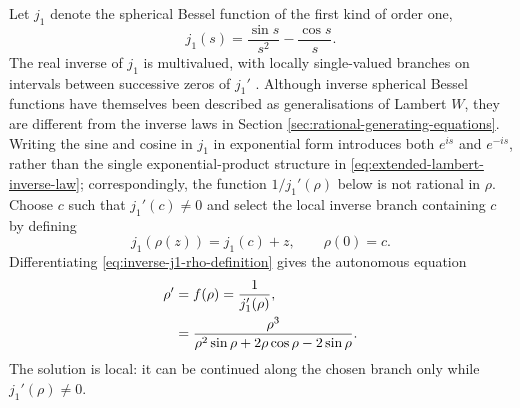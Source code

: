 \documentclass[11pt,a4paper]{article}
\numberwithin{equation}{section}
\begin{document}
Let $j_1$ denote the spherical Bessel function of the first kind of order one,
\begin{equation}
    j_1(s)=\frac{\sin s}{s^2}-\frac{\cos s}{s}.
\end{equation}
The real inverse of $j_1$ is multivalued, with locally single-valued branches on intervals between successive zeros of $j_1'$ \cite{stoutemyerInverseSphericalBessel2022}.
Although inverse spherical Bessel functions have themselves been described as generalisations of Lambert $W$, they are different from the inverse laws in Section \ref{sec:rational-generating-equations}.
Writing the sine and cosine in $j_1$ in exponential form introduces both $e^{is}$ and $e^{-is}$, rather than the single exponential-product structure in \eqref{eq:extended-lambert-inverse-law}; correspondingly, the function $1/j_1'(\rho)$ below is not rational in $\rho$.
Choose $c$ such that $j_1'(c)\ne0$ and select the local inverse branch containing $c$ by defining
\begin{equation}
    j_1(\rho(z))=j_1(c)+z,
    \qquad
    \rho(0)=c. \label{eq:inverse-j1-rho-definition}
\end{equation}
Differentiating \eqref{eq:inverse-j1-rho-definition} gives the autonomous equation
\begin{align}
    \rho'
    &=f(\rho)
    =\frac{1}{j_1'(\rho)}, \notag \\
    &=\frac{\rho^3}
    {\rho^2\sin\rho+2\rho\cos\rho-2\sin\rho}. \label{eq:inverse-j1-rho-ode}
\end{align}
The solution is local: it can be continued along the chosen branch only while $j_1'(\rho)\ne0$.
\end{document}
